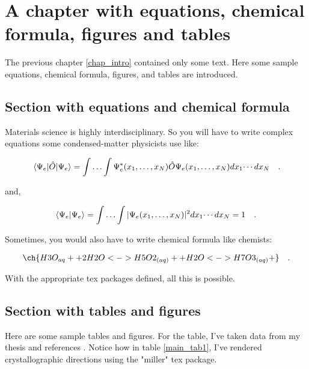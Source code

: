 \chapter{A chapter with equations, chemical formula, figures and tables}
\label{chap_main}

The previous chapter \ref{chap_intro} contained only some text. Here some sample
equations, chemical formula, figures, and tables
are introduced.

\section{Section with equations and chemical formula}
\label{sec_eq_fig_tab}

Materials science is highly interdisciplinary. So you will have to write complex
equations some condensed-matter physicists use like:

\begin{equation}
\expval{\hat{O}}{\Psi_e} = \int \dotsc \int \Psi_e^{*}(x_1,\dotsc,x_N) \hat{O}
\Psi_e(x_1,\dotsc ,x_N)  dx_1 \dotsi dx_N
\quad .
\label{main_eq1}
\end{equation}

and,

\begin{equation}
\braket{\Psi_e} = \int \dotsc \int |\Psi_e (x_1,\dotsc,x_N)|^2  dx_1\dotsi dx_N = 1
\quad .
\label{main_eq2}
\end{equation}

Sometimes, you would also have to write chemical formula like chemists:

\begin{equation}
\centering
\ch{H3O_{aq}+ + 2 H2O <-> H5O2_{(aq)}+ + H2O <-> H7O3_{(aq)}+} \quad .
\label{main_eq3}
\end{equation}

With the appropriate tex packages defined, all this is possible.

\section{Section with tables and figures}
\label{sec_tab_figs}

Here are some sample tables and figures. For the table, I've taken data from my
thesis and references \cite{Singh-miller2009, Sakong2018, Kittel1976, Salmeron1983}.
Notice how in table \ref{main_tab1}, I've rendered crystallographic directions using
the "miller" tex package.

